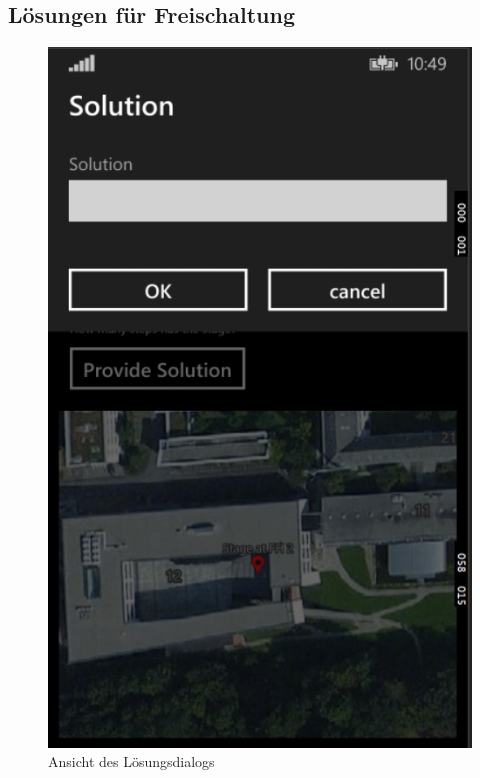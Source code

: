 \documentclass[a4paper,ngerman]{scrartcl}
\begin{document}
\subsection{Lösungen für Freischaltung}
\begin{figure}[h]
\centering
\includegraphics[width=.95\textwidth]{images/routeSolutionPage}
\caption{Ansicht des Lösungsdialogs}
\end{figure}
\end{document}
